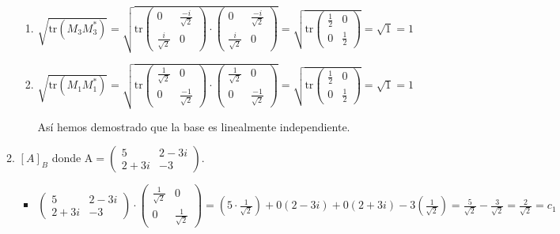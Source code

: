\documentclass{report}
\begin{document}
\begin{enumerate}
\begin{enumerate}[label=\alph*)]
\begin{enumerate}
    
    \item $ \sqrt{\text{tr}(M_3 M_3^*)} =\sqrt{\text{tr} \begin{pmatrix}
    0& \frac{-i}{\sqrt{2}}\\
    \frac{i}{\sqrt{2}} & 0
    \end{pmatrix} \cdot \begin{pmatrix}
    0& \frac{-i}{\sqrt{2}}\\
    \frac{i}{\sqrt{2}} & 0
    \end{pmatrix}}= \sqrt{\text{tr} \begin{pmatrix}
    \frac{1}{2} & 0 \\
    0 & \frac{1}{2}
    \end{pmatrix}} = \sqrt{1} = 1$ 
    
    \item $ \sqrt{\text{tr}(M_1 M_1^*)} =\sqrt{\text{tr} \begin{pmatrix}
    \frac{1}{\sqrt{2}}& 0\\
    0 & \frac{-1}{\sqrt{2}}
    \end{pmatrix} \cdot \begin{pmatrix}
    \frac{1}{\sqrt{2}} & 0\\
    0 & \frac{-1}{\sqrt{2}}
    \end{pmatrix}}= \sqrt{\text{tr} \begin{pmatrix}
    \frac{1}{2} & 0 \\
    0 & \frac{1}{2}
    \end{pmatrix}} = \sqrt{1} = 1$
    
    Así hemos demostrado que la base es linealmente independiente.
    
    \end{enumerate}
    
    \newpage
    \item $[A]_B$ donde A$=\begin{pmatrix}
        5 &2-3i\\
        2+3i & -3
    \end{pmatrix}$.
    \begin{itemize}
        \item $\begin{pmatrix}
        5 &2-3i\\
        2+3i & -3
    \end{pmatrix}\cdot\begin{pmatrix}
        \frac{1}{\sqrt{2}}& 0 \\
        0 & \frac{1}{\sqrt{2}}
    \end{pmatrix}= \left( 5\cdot\frac{1}{\sqrt{2}}\right) + 0 \left(2-3i\right) + 0\left(2+3i\right) - 3\left(\frac{1}{\sqrt{2}}\right)=\frac{5}{\sqrt{2}}-\frac{3}{\sqrt{2}}=\frac{2}{\sqrt{2}}=c_1$
    

\end{itemize}
\end{enumerate}
\end{enumerate}
\end{document}
